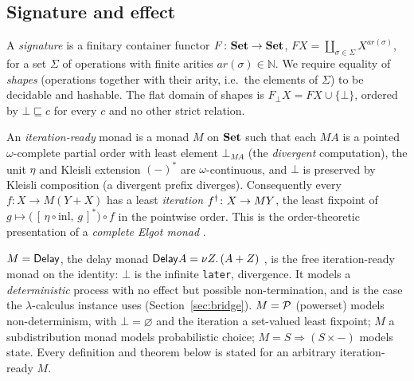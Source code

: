 \subsection{Signature and effect}
\begin{definition}\label{def:signature}
  A \emph{signature} is a finitary container functor $F\colon \mathbf{Set} \to \mathbf{Set}$,
  $F X = \coprod_{\sigma \in \Sigma} X^{\mathit{ar}(\sigma)}$, for a set $\Sigma$ of operations with
  finite arities $\mathit{ar}(\sigma) \in \mathbb{N}$. We require equality of \emph{shapes} (operations
  together with their arity, i.e.\ the elements of $\Sigma$) to be decidable and hashable. The flat
  domain of shapes is $F_{\bot} X = F X \cup \{\bot\}$, ordered by $\bot \sqsubseteq c$ for every $c$
  and no other strict relation.
\end{definition}

\begin{definition}\label{def:elgot}
  An \emph{iteration-ready} monad is a monad $M$ on $\mathbf{Set}$ such that each $M A$ is a pointed
  $\omega$-complete partial order with least element $\bot_{MA}$ (the \emph{divergent} computation), the
  unit $\eta$ and Kleisli extension $(-)^{*}$ are $\omega$-continuous, and $\bot$ is preserved by
  Kleisli composition (a divergent prefix diverges). Consequently every $f\colon X \to M(Y + X)$ has a
  least \emph{iteration} $f^{\dagger}\colon X \to M Y$, the least fixpoint of
  $g \mapsto \big(\,[\,\eta\circ\mathrm{inl},\,g\,]^{*}\big)\circ f$ in the pointwise order. This is the
  order-theoretic presentation of a \emph{complete Elgot monad} .
\end{definition}

\begin{example}[Effects]\label{ex:effects}
  $M = \mathsf{Delay}$, the delay monad $\mathsf{Delay} A = \nu Z.\,(A + Z)$ , is the free
  iteration-ready monad on the identity: $\bot$ is the infinite \texttt{later}, divergence. It models a
  \emph{deterministic} process with no effect but possible non-termination, and is the case the
  $\lambda$-calculus instance uses (Section~\ref{sec:bridge}). $M = \mathcal{P}$ (powerset) models
  non-determinism, with $\bot = \varnothing$ and the iteration a set-valued least fixpoint; $M$ a
  subdistribution monad models probabilistic choice; $M = S \Rightarrow (S \times -)$ models state.
  Every definition and theorem below is stated for an arbitrary iteration-ready $M$.
\end{example}

